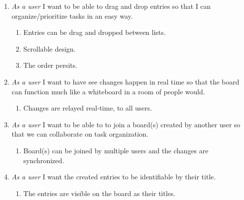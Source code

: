\documentclass{article}
\begin{document}
\begin{enumerate}
	\item \emph{As a user} I want to be able to drag and drop entries so that I can organize/prioritize tasks in an easy way.
		\begin{enumerate}
			\item Entries can be drag and dropped between lists.
			\item Scrollable design.
			\item The order persits.
		\end{enumerate}
	\item \emph{As a user} I want to have see changes happen in real time so that the board can function much like a whiteboard in a room of people would.
		\begin{enumerate}
			\item Changes are relayed real-time, to all users.
		\end{enumerate}
		\item \emph{As a user} I want to be able to to join a board(s) created by another user so that we can collaborate on task organization.
			\begin{enumerate}
				\item Board(s) can be joined by multiple users and the changes are synchronized.
			\end{enumerate}
		\item \emph{As a user} I want the created entries to be identifiable by their title.
			\begin{enumerate}
				\item The entries are visible on the board as their titles.
			\end{enumerate}
	\end{enumerate}
		
\end{document}
